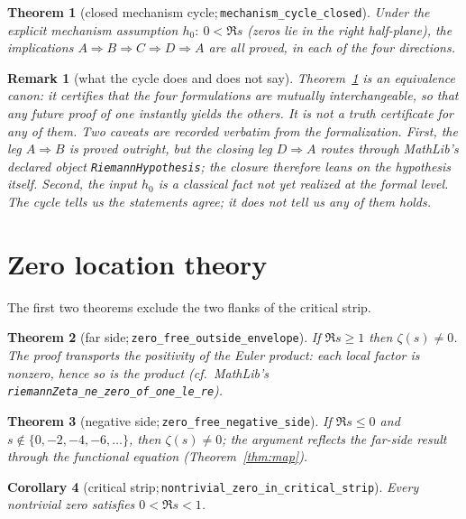 \documentclass[submission]{jsfds}
\newtheorem{theorem}{Theorem}
\newtheorem{corollary}[theorem]{Corollary}
\newtheorem*{remark}{Remark}
\newcommand{\Lean}[1]{\texttt{#1}}
\begin{document}
\begin{theorem}[closed mechanism cycle;\,\Lean{mechanism_cycle_closed}]
\label{thm:cycle}
Under the explicit mechanism assumption $h_0:\ 0<\Re s$ (zeros lie in the right
half-plane), the implications $A\Rightarrow B\Rightarrow C\Rightarrow D\Rightarrow
A$ are all proved, in each of the four directions.
\end{theorem}

\begin{remark}[what the cycle does and does not say]\label{rem:cycle}
Theorem~\ref{thm:cycle} is an \emph{equivalence canon}: it certifies that the
four formulations are mutually interchangeable, so that any future proof of one
instantly yields the others. It is \emph{not} a truth certificate for any of
them. Two caveats are recorded verbatim from the formalization. First, the leg
$A\Rightarrow B$ is proved outright, but the closing leg $D\Rightarrow A$ routes
through MathLib's declared object \Lean{RiemannHypothesis}; the closure
therefore leans on the hypothesis itself. Second, the input $h_0$ is a
classical fact not yet realized at the formal level. The cycle tells us the
statements agree; it does not tell us any of them holds.
\end{remark}

\section{Zero location theory}\label{sec:zerolocation}

The first two theorems exclude the two flanks of the critical strip.

\begin{theorem}[far side;\,\Lean{zero_free_outside_envelope}]\label{thm:farside}
If $\Re s\geq 1$ then $\zeta(s)\neq 0$. The proof transports the positivity of
the Euler product: each local factor is nonzero, hence so is the product
(cf.\ MathLib's \Lean{riemannZeta_ne_zero_of_one_le_re}).
\end{theorem}

\begin{theorem}[negative side;\,\Lean{zero_free_negative_side}]
\label{thm:negside}
If $\Re s\leq 0$ and $s\notin\{0,-2,-4,-6,\dots\}$, then $\zeta(s)\neq 0$; the
argument reflects the far-side result through the functional equation
(Theorem~\ref{thm:map}).
\end{theorem}

\begin{corollary}[critical strip;\,\Lean{nontrivial_zero_in_critical_strip}]
\label{cor:strip}
Every nontrivial zero satisfies $0<\Re s<1$.
\end{corollary}
\end{document}
